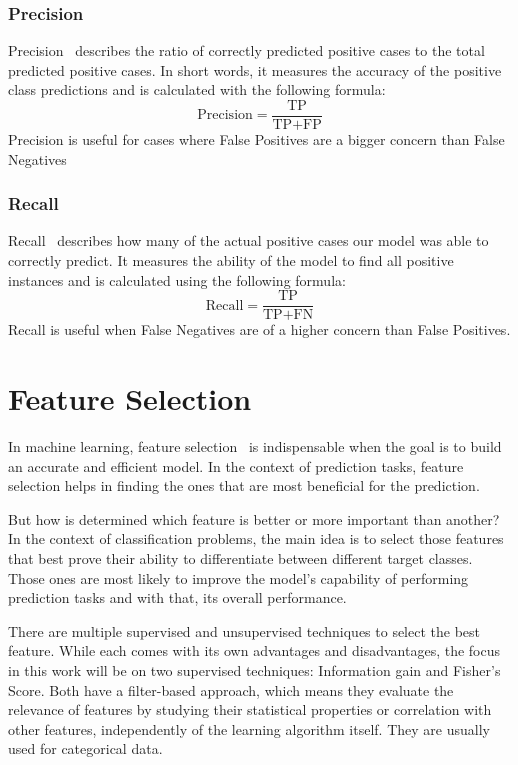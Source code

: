 \subsubsection{Precision}
Precision~\cite{evaluation_metrics} describes the ratio of correctly predicted positive cases to the total predicted positive cases. In short words, it measures the accuracy of the positive class predictions and is calculated with the following formula:
\[ \text{Precision} = \frac{\text{TP}}{\text{TP} + \text{FP}} \]
Precision is useful for cases where False Positives are a bigger concern than False Negatives

\subsubsection{Recall}
Recall~\cite{evaluation_metrics} describes how many of the actual positive cases our model was able to correctly predict. It measures the ability of the model to find all positive instances and is calculated using the following formula:
\[ \text{Recall} = \frac{\text{TP}}{\text{TP} + \text{FN}} \]
Recall is useful when False Negatives are of a higher concern than False Positives.

\section{Feature Selection}
In machine learning, feature selection~\cite{feature_selection} is indispensable when the goal is to build an accurate and efficient model. In the context of prediction tasks, feature selection helps in finding the ones that are most beneficial for the prediction. 

But how is determined which feature is better or more important than another? In the context of classification problems, the main idea is to select those features that best prove their ability to differentiate between different target classes. Those ones are most likely to improve the model's capability of performing prediction tasks and with that, its overall performance.

There are multiple supervised and unsupervised techniques to select the best feature. While each comes with its own advantages and disadvantages, the focus in this work will be on two supervised techniques: Information gain and Fisher's Score. Both have a filter-based approach, which means they evaluate the relevance of features by studying their statistical properties or correlation with other features, independently of the learning algorithm itself. They are usually used for categorical data.

